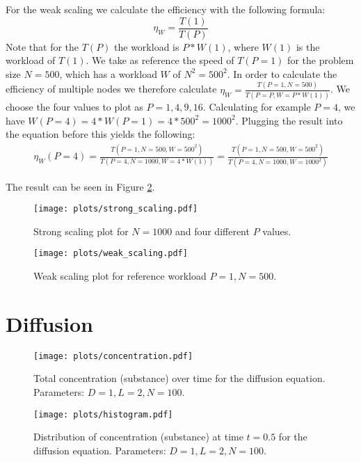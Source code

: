 \documentclass[a4paper,10pt]{article} %
\begin{document}
For the weak scaling we calculate the efficiency with the following formula:
\begin{equation}
    \eta_W = \frac{T(1)}{T(P)}
\end{equation}
Note that for the $T(P)$ the workload is $P * W(1)$, where $W(1)$ is the workload of $T(1)$.
We take as reference the speed of $T(P=1)$ for the problem size $N=500$, which has a workload $W$ of $N^2 = 500^2$. In order to calculate the efficiency of multiple nodes we therefore calculate $\eta_W = \frac{T(P=1, N=500)}{T(P=P, W=P*W(1))}$. We choose the four values to plot as $P={1, 4, 9, 16}$. Calculating for example $P=4$, we have $W(P=4) = 4 * W(P=1) = 4 * 500^2 = 1000^2$.
Plugging the result into the equation before this yields the following:
\begin{equation}\label{ex_weak}
\begin{split}
        \eta_W(P=4) = \frac{T(P=1, N=500, W=500^2)}{T(P=4, N=1000 , W=4*W(1))}
                    = \frac{T(P=1, N=500, W=500^2)}{T(P=4, N=1000 , W=1000^2)}
\end{split}
\end{equation}

The result can be seen in Figure \ref{fig:weak_scaling}.

\begin{figure}[h]
  \centering
  \begin{minipage}[t]{0.45\textwidth}
    \texttt{[image: plots/strong\_scaling.pdf]}
    \caption{Strong scaling plot for $N=1000$ and four different $P$ values.}
    \label{fig:strong_scaling}
  \end{minipage}
  \hfill
  \begin{minipage}[t]{0.45\textwidth}
    \texttt{[image: plots/weak\_scaling.pdf]}
    \caption{Weak scaling plot for reference workload $P=1, N=500$.}
    \label{fig:weak_scaling}
  \end{minipage}
\end{figure}

\section{Diffusion}

\begin{figure}[H]
  \centering
  \begin{minipage}[t]{0.9\textwidth}
    \texttt{[image: plots/concentration.pdf]}
    \caption{Total concentration (substance) over time for the diffusion equation. Parameters: $D = 1, L = 2, N = 100$.}
    \label{fig:strong_scaling}
  \end{minipage}
  \hfill
  \begin{minipage}[t]{0.9\textwidth}
    \texttt{[image: plots/histogram.pdf]}
    \caption{Distribution of concentration (substance) at time $t=0.5$ for the diffusion equation. Parameters: $D = 1, L = 2, N = 100$.}
    \label{fig:weak_scaling}
  \end{minipage}
\end{figure}
\end{document}
